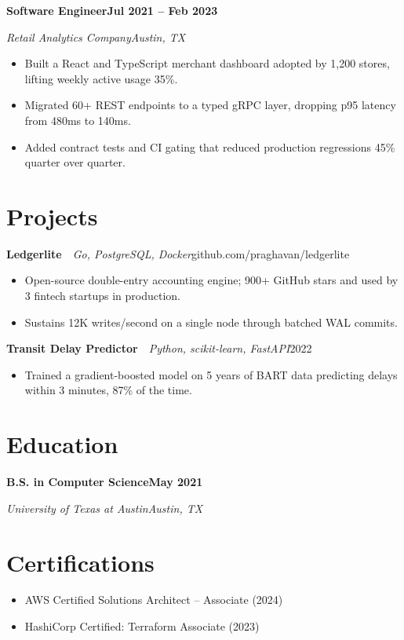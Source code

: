 \documentclass[letterpaper,10pt]{article}
\newcommand{\rRole}[4]{%
  \vspace{3pt}%
  \noindent\textbf{#1}\hfill\textbf{#4}\par
  \noindent\textit{\color{muted}#2}\hfill\textit{\color{muted}#3}\par
  \vspace{1pt}%
}
\newcommand{\rProject}[3]{%
  \vspace{3pt}%
  \noindent\textbf{#1}\ \textbar\ \textit{\color{muted}#2}\hfill#3\par
  \vspace{1pt}%
}
\newcommand{\rEdu}[4]{%
  \vspace{3pt}%
  \noindent\textbf{#1}\hfill\textbf{#4}\par
  \noindent\textit{\color{muted}#2}\hfill\textit{\color{muted}#3}\par
  \vspace{1pt}%
}
\newenvironment{rBullets}
  {\begin{itemize}[leftmargin=13pt,itemsep=1.5pt,parsep=0pt,topsep=2pt,
                   partopsep=0pt,label=\textbullet]}
  {\end{itemize}}
\begin{document}
\rRole{Software Engineer}{Retail Analytics Company}{Austin, TX}{Jul 2021 -- Feb 2023}
\begin{rBullets}
  \item Built a React and TypeScript merchant dashboard adopted by 1,200 stores, lifting weekly active usage 35\%.
  \item Migrated 60+ REST endpoints to a typed gRPC layer, dropping p95 latency from 480ms to 140ms.
  \item Added contract tests and CI gating that reduced production regressions 45\% quarter over quarter.
\end{rBullets}

\section{Projects}

\rProject{Ledgerlite}{Go, PostgreSQL, Docker}{github.com/praghavan/ledgerlite}
\begin{rBullets}
  \item Open-source double-entry accounting engine; 900+ GitHub stars and used by 3 fintech startups in production.
  \item Sustains 12K writes/second on a single node through batched WAL commits.
\end{rBullets}

\rProject{Transit Delay Predictor}{Python, scikit-learn, FastAPI}{2022}
\begin{rBullets}
  \item Trained a gradient-boosted model on 5 years of BART data predicting delays within 3 minutes, 87\% of the time.
\end{rBullets}

\section{Education}
\rEdu{B.S. in Computer Science}{University of Texas at Austin}{Austin, TX}{May 2021}

\section{Certifications}
\begin{rBullets}
  \item AWS Certified Solutions Architect -- Associate (2024)
  \item HashiCorp Certified: Terraform Associate (2023)
\end{rBullets}
\end{document}
